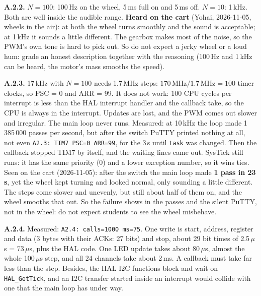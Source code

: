 \documentclass[11pt,a4paper]{article}
\newcommand{\lv}[1]{\texttt{#1}}                 %
\begin{document}
\textbf{A.2.2.} $N = 100$: 100\,Hz on the wheel, 5\,ms full on and 5\,ms off. $N = 10$: 1\,kHz. Both are well
inside the audible range. \textbf{Heard on the cart} (Yohai, 2026-11-05, wheels in the air): at both the wheel
turns smoothly and the sound is acceptable; at 1\,kHz it sounds a little different. The gearbox makes most of the
noise, so the PWM's own tone is hard to pick out. So do not expect a jerky wheel or a loud hum: grade an honest
description together with the reasoning (100\,Hz and 1\,kHz can be heard, the motor's mass smooths the speed).

\textbf{A.2.3.} 17\,kHz with $N = 100$ needs 1.7\,MHz steps: $170\,\mathrm{MHz}/1.7\,\mathrm{MHz} = 100$ timer clocks,
so PSC = 0 and ARR = 99. It does not work: 100 CPU cycles per interrupt is less than the HAL interrupt handler and the
callback take, so the CPU is always in the interrupt. Updates are lost, and the PWM comes out slower and irregular.
The main loop never runs. Measured: at 10\,kHz the loop made 1\,385\,000 passes per second, but after the switch
PuTTY printed nothing at all, not even \texttt{A2.3: TIM7 PSC=0 ARR=99}, for the 3\,s until \lv{task} was changed.
Then the callback stopped TIM7 by itself, and the waiting lines came out. SysTick still runs: it has the same priority
(0) and a lower exception number, so it wins ties. Seen on the cart (2026-11-05): after the switch the main loop made
\textbf{1 pass in 23\,s}, yet the wheel kept turning and looked normal, only sounding a little different. The
steps come slower and unevenly, but still about half of them on, and the wheel smooths that out. So the failure
shows in the passes and the silent PuTTY, not in the wheel: do not expect students to see the wheel misbehave.

\textbf{A.2.4.} Measured: \texttt{A2.4: calls=1000 ms=75}. One write is start, address, register
and data (3 bytes with their ACKs: 27 bits) and stop, about 29 bit times of 2.5\,$\mu$s = 73\,$\mu$s, plus the HAL code.
One LED update takes about 80\,$\mu$s, almost the whole 100\,$\mu$s step, and all 24 channels take about 2\,ms. A
callback must take far less than the step. Besides, the HAL I2C functions block and wait on \texttt{HAL\_GetTick},
and an I2C transfer started inside an interrupt would collide with one that the main loop has under way.
\end{document}
